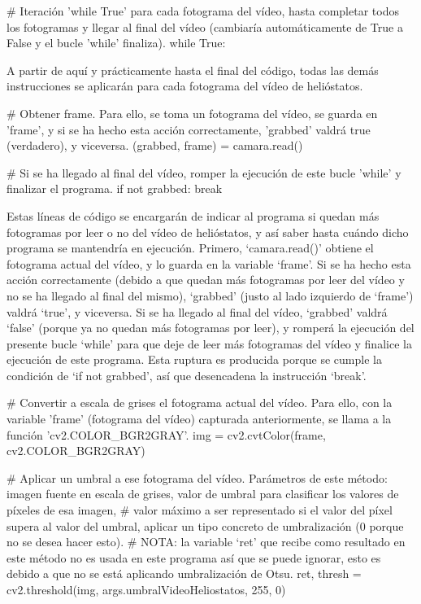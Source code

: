 \documentclass[12pt]{article}
\begin{document}
\# Iteración 'while True' para cada fotograma del vídeo, hasta completar todos los fotogramas y llegar al final del vídeo (cambiaría automáticamente de True a False y el bucle 'while' finaliza).
while True:

A partir de aquí y prácticamente hasta el final del código, todas las demás instrucciones se aplicarán para cada fotograma del vídeo de helióstatos.

    
    \# Obtener frame. Para ello, se toma un fotograma del vídeo, se guarda en 'frame', y si se ha hecho esta acción correctamente, 'grabbed' valdrá true (verdadero), y viceversa.
    (grabbed, frame) = camara.read()

    \# Si se ha llegado al final del vídeo, romper la ejecución de este bucle 'while' y finalizar el programa.
    if not grabbed:
        break

Estas líneas de código se encargarán de indicar al programa si quedan más fotogramas por leer o no del vídeo de helióstatos, y así saber hasta cuándo dicho programa se mantendría en ejecución. Primero, ‘camara.read()’ obtiene el fotograma actual del vídeo, y lo guarda en la variable ‘frame’. Si se ha hecho esta acción correctamente (debido a que quedan más fotogramas por leer del vídeo y no se ha llegado al final del mismo), ‘grabbed’ (justo al lado izquierdo de ‘frame’) valdrá ‘true’, y viceversa. Si se ha llegado al final del vídeo, ‘grabbed’ valdrá ‘false’ (porque ya no quedan más fotogramas por leer), y romperá la ejecución del presente bucle ‘while’ para que deje de leer más fotogramas del vídeo y finalice la ejecución de este programa. Esta ruptura es producida porque se cumple la condición de ‘if not grabbed’, así que desencadena la instrucción ‘break’.


    \# Convertir a escala de grises el fotograma actual del vídeo. Para ello, con la variable 'frame' (fotograma del vídeo) capturada anteriormente, se llama a la función 'cv2.COLOR\_BGR2GRAY'.
    img = cv2.cvtColor(frame, cv2.COLOR\_BGR2GRAY)
    
    \# Aplicar un umbral a ese fotograma del vídeo. Parámetros de este método: imagen fuente en escala de grises, valor de umbral para clasificar los valores de píxeles de esa imagen,
    \# valor máximo a ser representado si el valor del píxel supera al valor del umbral, aplicar un tipo concreto de umbralización (0 porque no se desea hacer esto).
    \# NOTA: la variable ‘ret’ que recibe como resultado en este método no es usada en este programa así que se puede ignorar, esto es debido a que no se está aplicando umbralización de Otsu.
    ret, thresh = cv2.threshold(img, args.umbralVideoHeliostatos, 255, 0)
    
\end{document}
